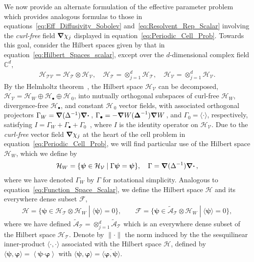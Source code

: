 \documentclass[leqno,onefignum,onetabnum]{siamltex1213}
\newcommand{\Tc}{\mathcal{T}}
\newcommand{\Vc}{\mathcal{V}}
\newcommand{\Hc}{\mathcal{H}}
\newcommand{\Fc}{\mathcal{F}}
\newcommand{\Ac}{\mathcal{A}}
\newcommand{\Hs}{\mathscr{H}}
\newcommand{\As}{\mathscr{A}}
\newcommand\bDelta{\mbox{\boldmath${\Delta}$}}
\newcommand\bnabla{\mbox{\boldmath${\nabla}$}}
\providecommand\bcdot{\boldsymbol{\cdot}}
\newcommand{\vecpsi}{\boldsymbol{\psi}}
\newcommand{\vecvarphi}{\boldsymbol{\varphi}}
\begin{document}
We now provide an alternate formulation of the effective parameter
problem~\cite{Avellaneda:PRL-753,Avellaneda:CMP-339} which provides
analogous formulas to those in
equations~\eqref{eq:Eff_Diffusivity_Sobolev}
and~\eqref{eq:Resolvent_Rep_Scalar} involving the \emph{curl-free}
field $\bnabla\chi_j$ displayed in
equation~\eqref{eq:Periodic_Cell_Prob}. Towards this goal, consider 
the Hilbert spaces given by that in
equation~\eqref{eq:Hilbert_Spaces_scalar}, except over the
$d$-dimensional complex field $\mathbb{C}^d$,
%
\begin{align}\label{eq:Hilbert_Spaces_vector}
  \Hc_{\Tc\Vc}=\Hc_{\Tc}\otimes\Hc_{\Vc}, \quad
  \Hc_{\Tc}=\otimes_{j=1}^d\Hs_{\Tc}, \quad
  \Hc_{\Vc}=\otimes_{j=1}^d\Hs_{\Vc}.
\end{align}
%
By the Helmholtz theorem~\cite{Denaro:2003:0271,Bhatia:IEE:1077}, the
Hilbert space $\Hc_{\Vc}$ can be decomposed,
$\Hc_{\Vc}=\Hc_W\oplus\Hc_\bullet\oplus\Hc_{\,0}$, into mutually orthogonal
subspaces of curl-free $\Hc_W$, divergence-free $\Hc_\bullet$, and constant
$\Hc_{\,0}$ vector fields, with associated orthogonal projectors
$\Gamma_W=\bnabla (\Delta^{-1})\bnabla \bcdot\,$, $\Gamma_\bullet=-\bnabla
W(\bDelta^{-1})\bnabla W\,$, and $\Gamma_0=\langle\cdot\rangle$,
respectively, satisfying
$I=\Gamma_W+\Gamma_\bullet+\Gamma_0$~\cite{Fannjiang:1994:SIAM_JAM:333,MILTON:2002:TC}, where
$I$ is the identity operator on $\Hc_{\Vc}$.
Due to the \emph{curl-free} vector field $\bnabla\chi_j$ at the heart of
the cell problem in equation~\eqref{eq:Periodic_Cell_Prob}, we will
find particular use of the Hilbert space $\Hc_W$, which we define by
%
\begin{align}\label{eq:Hilbert_Curl_Free}
  \Hc_W=\{\vecpsi\in\Hc_{\Vc} \; | \; \Gamma\vecpsi=\vecpsi\},
  \quad
  \Gamma=\bnabla (\Delta^{-1})\bnabla \bcdot\,,
\end{align}
%
where we have denoted $\Gamma_W$ by $\Gamma$ for notational simplicity. 
Analogous to equation~\eqref{eq:Function_Space_Scalar},
we define the Hilbert space $\Hc$ and its everywhere dense subset
$\Fc$, 
%
\begin{align}\label{eq:Function_Space_Vector} 
  \Hc=\{\vecpsi\in\Hc_{\Tc}\otimes\Hc_W \; | \; \langle \vecpsi\rangle=0\}, \qquad
  \Fc=\{\vecpsi\in\tilde{\Ac}_{\Tc}\otimes\Hc_W \; | \; \langle \vecpsi\rangle=0\},
\end{align}
%
where we have defined $\tilde{\Ac}_{\Tc}=\otimes_{j=1}^d\tilde{\As}_{\Tc}$
which is an everywhere dense subset of the Hilbert space
$\Hc_{\Tc}$. Denote by $\|\cdot\|$ the norm induced by the the sesquilinear
inner-product $\langle\cdot,\cdot\rangle$ associated with the Hilbert space $\Hc$, defined
by $\langle\vecpsi,\vecvarphi\rangle=\left\langle\vecpsi\bcdot\vecvarphi \right\rangle$
with $\langle\vecpsi,\vecvarphi\rangle=\overline{\langle\vecvarphi,\vecpsi\rangle}$. 
\end{document}
